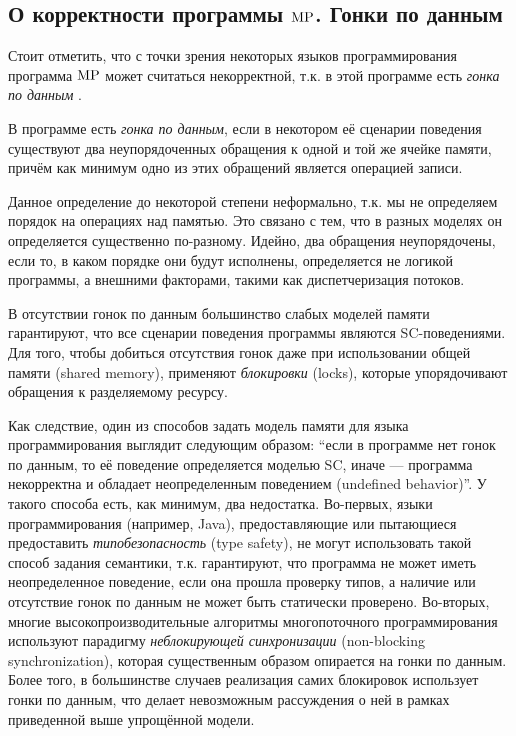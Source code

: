 \subsection{О корректности программы ${\rm MP}$. Гонки по данным}
Стоит отметить, что с точки зрения некоторых языков программирования программа ${\rm MP}$ может считаться некорректной,
т.к. в этой программе есть \emph{гонка по данным} \cite{Unger:ITC95}.
\begin{definition}
  \label{def:datarace}
  В программе есть \emph{гонка по данным}, если в некотором её сценарии поведения существуют два неупорядоченных
  обращения к одной и той же ячейке памяти, причём как минимум одно из этих обращений является операцией записи.
\end{definition}
Данное определение до некоторой степени неформально, т.к. мы не определяем порядок на операциях над памятью.
Это связано с тем, что в разных моделях он определяется существенно по-разному.
Идейно, два обращения неупорядочены, если то, в каком порядке они будут исполнены, определяется не логикой
программы, а внешними факторами, такими как диспетчеризация потоков.

В отсутствии гонок по данным большинство слабых моделей памяти гарантируют, что все сценарии поведения программы
являются SC-поведениями. Для того, чтобы добиться отсутствия гонок даже при использовании общей памяти (shared memory),
применяют \emph{блокировки} (locks), которые упорядочивают обращения к разделяемому ресурсу.

Как следствие, один из способов задать модель памяти для языка программирования выглядит следующим образом:
``если в программе нет гонок по данным, то её поведение определяется моделью SC, иначе --- программа некорректна и
обладает неопределенным поведением (undefined behavior)''.
У такого способа есть, как минимум, два недостатка.
Во-первых, языки программирования  (например, Java), предоставляющие или пытающиеся предоставить
\emph{типобезопасность} (type safety), не могут использовать такой способ задания семантики,
т.к. гарантируют, что программа не может иметь неопределенное поведение, если она прошла проверку типов, а
наличие или отсутствие гонок по данным не может быть статически проверено. 
Во-вторых, многие высокопроизводительные алгоритмы многопоточного программирования используют парадигму
\emph{неблокирующей синхронизации} (non-blocking synchronization), которая существенным образом опирается
на гонки по данным. Более того, в большинстве случаев реализация самих блокировок использует гонки по данным,
что делает невозможным рассуждения о ней в рамках приведенной выше упрощённой модели.

